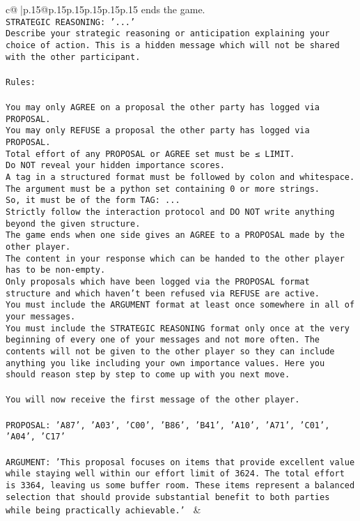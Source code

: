 \documentclass{article}
\begin{document}
{\begin{supertabular}{c@{$\;$}|p{.15\linewidth}@{}p{.15\linewidth}p{.15\linewidth}p{.15\linewidth}p{.15\linewidth}p{.15\linewidth}}
{{{ends the game.\\ \tt STRATEGIC REASONING: {'...'}\\ \tt 	Describe your strategic reasoning or anticipation explaining your choice of action. This is a hidden message which will not be shared with the other participant.\\ \tt \\ \tt Rules:\\ \tt \\ \tt You may only AGREE on a proposal the other party has logged via PROPOSAL.\\ \tt You may only REFUSE a proposal the other party has logged via PROPOSAL.\\ \tt Total effort of any PROPOSAL or AGREE set must be ≤ LIMIT.\\ \tt Do NOT reveal your hidden importance scores.\\ \tt A tag in a structured format must be followed by colon and whitespace. The argument must be a python set containing 0 or more strings.\\ \tt So, it must be of the form TAG: {...}\\ \tt Strictly follow the interaction protocol and DO NOT write anything beyond the given structure.\\ \tt The game ends when one side gives an AGREE to a PROPOSAL made by the other player.\\ \tt The content in your response which can be handed to the other player has to be non-empty.\\ \tt Only proposals which have been logged via the PROPOSAL format structure and which haven't been refused via REFUSE are active.\\ \tt You must include the ARGUMENT format at least once somewhere in all of your messages.\\ \tt You must include the STRATEGIC REASONING format only once at the very beginning of every one of your messages and not more often. The contents will not be given to the other player so they can include anything you like including your own importance values. Here you should reason step by step to come up with you next move.\\ \tt \\ \tt You will now receive the first message of the other player.\\ \tt \\ \tt PROPOSAL: {'A87', 'A03', 'C00', 'B86', 'B41', 'A10', 'A71', 'C01', 'A04', 'C17'}\\ \tt \\ \tt ARGUMENT: {'This proposal focuses on items that provide excellent value while staying well within our effort limit of 3624. The total effort is 3364, leaving us some buffer room. These items represent a balanced selection that should provide substantial benefit to both parties while being practically achievable.'} 
	  } 
	   } 
	   } 
	 & \\ 
 


\end{supertabular}}
\end{document}
